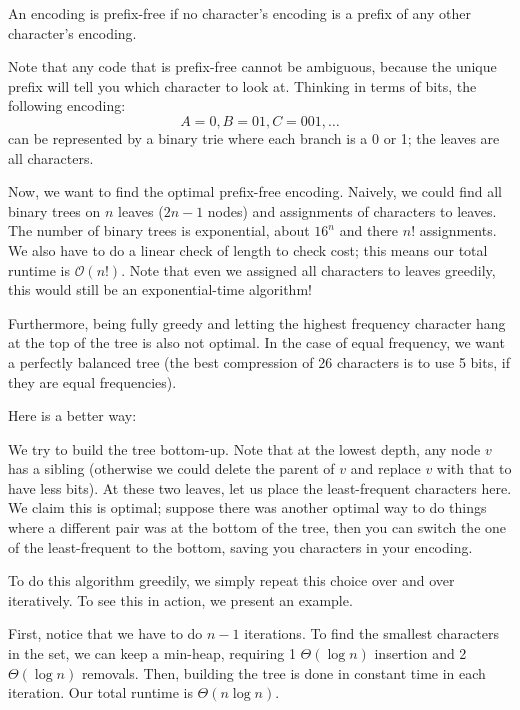 \begin{definition} 
    An encoding is prefix-free if no character's encoding is a prefix of any other character's encoding.
\end{definition}

Note that any code that is prefix-free cannot be ambiguous, because the unique prefix will tell you which character to look at. Thinking in terms of bits,
the following encoding:
\[ A = 0, B = 01, C = 001, \dots \]
can be represented by a binary trie where each branch is a 0 or 1; the leaves are all characters.

Now,
we want to find the optimal prefix-free encoding. Naively, we could find all binary trees on $n$ leaves ($2n - 1$ nodes) and assignments of characters to leaves.
The number of binary trees is exponential, about $16^n$ and there $n!$ assignments. We also have to do a linear check of length to check cost; this means our total runtime is $\mathcal{O}(n!)$.
Note that even we assigned all characters to leaves greedily, this would still be an exponential-time algorithm! 

Furthermore, being fully greedy and letting the highest frequency character hang at the top of the tree is also not optimal.
In the case of equal frequency, we want a perfectly balanced tree (the best compression of 26 characters is to use 5 bits, if they are equal frequencies). 

Here is a better way:

\begin{algothm}
    We try to build the tree bottom-up. Note that at the lowest depth, any node $v$ has a sibling (otherwise we could delete the parent of $v$ and replace $v$ with that to have less bits).
    At these two leaves, let us place the least-frequent characters here. We claim this is optimal; suppose there was another optimal way to do things where a different pair was at the
    bottom of the tree, then you can switch the one of the least-frequent to the bottom, saving you characters in your encoding.

    To do this algorithm greedily, we simply repeat this choice over and over iteratively. To see this in action, we present an example.

    First, notice that we have to do $n - 1$ iterations. To find the smallest characters in the set,
    we can keep a min-heap, requiring 1 $\Theta(\log n)$ insertion and 2 $\Theta(\log n)$ removals. Then, building the tree is done in constant time in each iteration.
    Our total runtime is $\Theta(n \log n)$.
\end{algothm}

